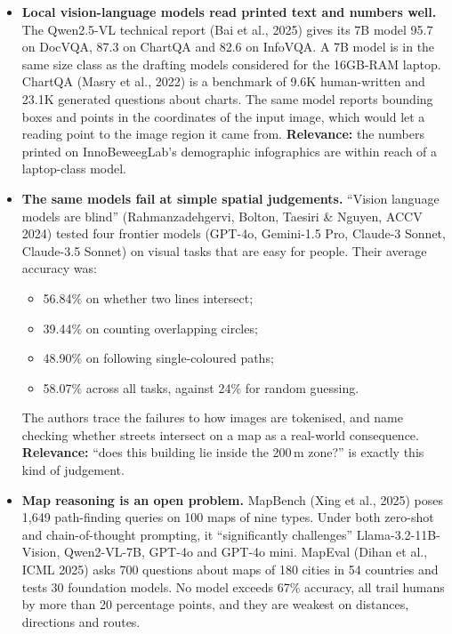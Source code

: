 \begin{itemize}
\item \textbf{Local vision-language models read printed text and numbers well.} The Qwen2.5-VL technical report (Bai et al., 2025) gives its 7B model 95.7 on DocVQA, 87.3 on ChartQA and 82.6 on InfoVQA. A 7B model is in the same size class as the drafting models considered for the 16GB-RAM laptop. ChartQA (Masry et al., 2022) is a benchmark of 9.6K human-written and 23.1K generated questions about charts. The same model reports bounding boxes and points in the coordinates of the input image, which would let a reading point to the image region it came from. \textbf{Relevance:} the numbers printed on InnoBeweegLab's demographic infographics are within reach of a laptop-class model.
\item \textbf{The same models fail at simple spatial judgements.} \textquotedblleft{}Vision language models are blind\textquotedblright{} (Rahmanzadehgervi, Bolton, Taesiri \& Nguyen, ACCV 2024) tested four frontier models (GPT-4o, Gemini-1.5 Pro, Claude-3 Sonnet, Claude-3.5 Sonnet) on visual tasks that are easy for people. Their average accuracy was:
\begin{itemize}
\item 56.84\% on whether two lines intersect;
\item 39.44\% on counting overlapping circles;
\item 48.90\% on following single-coloured paths;
\item 58.07\% across all tasks, against 24\% for random guessing.
\end{itemize}
The authors trace the failures to how images are tokenised, and name checking whether streets intersect on a map as a real-world consequence. \textbf{Relevance:} \textquotedblleft{}does this building lie inside the 200\,m zone?\textquotedblright{} is exactly this kind of judgement.
\item \textbf{Map reasoning is an open problem.} MapBench (Xing et al., 2025) poses 1,649 path-finding queries on 100 maps of nine types. Under both zero-shot and chain-of-thought prompting, it \textquotedblleft{}significantly challenges\textquotedblright{} Llama-3.2-11B-Vision, Qwen2-VL-7B, GPT-4o and GPT-4o mini. MapEval (Dihan et al., ICML 2025) asks 700 questions about maps of 180 cities in 54 countries and tests 30 foundation models. No model exceeds 67\% accuracy, all trail humans by more than 20 percentage points, and they are weakest on distances, directions and routes.

\end{itemize}
